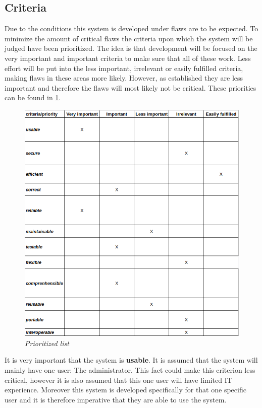 \subsection{Criteria}
Due to the conditions this system is developed under flaws are to be expected. 
To minimize the amount of critical flaws the criteria \citep[p.~180]{Rod-Aalborg} upon which the system will be judged have been prioritized.
The idea is that development will be focused on the very important and important criteria to make sure that all of these work.
Less effort will be put into the less important, irrelevant or easily fulfilled criteria, making flaws in these areas more likely.
However, as established they are less important and therefore the flaws will most likely not be critical.
These priorities can be found in \ref{fig:criteria}.

\begin{figure}[H]
	\centering
	\includegraphics[width=1\textwidth]{billeder/architecture-priorities.png}
	\caption{\textit{Prioritized list
	}\label{fig:criteria}}
\end{figure}

It is very important that the system is \textbf{usable}. It is assumed that the system will mainly have one user: The administrator. This fact could make this criterion less critical, however it is also assumed that this one user will have limited IT experience. Moreover this system is developed specifically for that one specific user and it is therefore imperative that they are able to use the system.

